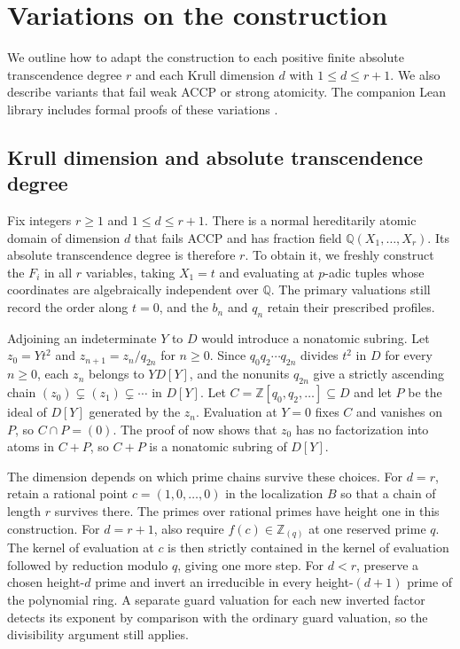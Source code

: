 \documentclass{article}
\theoremstyle{remark}
\begin{document}
\section{Variations on the construction}

We outline how to adapt the construction to each positive finite absolute transcendence degree $r$ and each Krull dimension $d$ with $1 \le d \le r + 1$.
We also describe variants that fail weak ACCP or strong atomicity.
The companion Lean library includes formal proofs of these variations \cite{LeanHA}.

\subsection{Krull dimension and absolute transcendence degree}
Fix integers $r \ge 1$ and $1 \le d \le r + 1$.
There is a normal hereditarily atomic domain of dimension $d$ that fails ACCP and has fraction field $\mathbb{Q}(X_1, \ldots, X_r)$.
Its absolute transcendence degree is therefore $r$.
To obtain it, we freshly construct the $F_i$ in all $r$ variables, taking $X_1 = t$ and evaluating at $p$-adic tuples whose coordinates are algebraically independent over $\mathbb{Q}$.
The primary valuations still record the order along $t = 0$, and the $b_n$ and $q_n$ retain their prescribed profiles.

Adjoining an indeterminate $Y$ to $D$ would introduce a nonatomic subring.
Let $z_0 = Yt^2$ and $z_{n + 1} = z_n/q_{2n}$ for $n \ge 0$.
Since $q_0 q_2 \cdots q_{2n}$ divides $t^2$ in $D$ for every $n \ge 0$, each $z_n$ belongs to $YD[Y]$, and the nonunits $q_{2n}$ give a strictly ascending chain $(z_0) \subsetneq (z_1) \subsetneq \cdots$ in $D[Y]$.
Let $C = \mathbb{Z}[q_0, q_2, \ldots] \subseteq D$ and let $P$ be the ideal of $D[Y]$ generated by the $z_n$.
Evaluation at $Y = 0$ fixes $C$ and vanishes on $P$, so $C \cap P = (0)$.
The proof of \cite[Theorem~6.4(6)]{CGH} now shows that $z_0$ has no factorization into atoms in $C + P$, so $C + P$ is a nonatomic subring of $D[Y]$.

The dimension depends on which prime chains survive these choices.
For $d = r$, retain a rational point $c = (1, 0, \ldots, 0)$ in the localization $B$ so that a chain of length $r$ survives there.
The primes over rational primes have height one in this construction.
For $d = r + 1$, also require $f(c) \in \mathbb{Z}_{(q)}$ at one reserved prime $q$.
The kernel of evaluation at $c$ is then strictly contained in the kernel of evaluation followed by reduction modulo $q$, giving one more step.
For $d < r$, preserve a chosen height-$d$ prime and invert an irreducible in every height-$(d + 1)$ prime of the polynomial ring.
A separate guard valuation for each new inverted factor detects its exponent by comparison with the ordinary guard valuation, so the divisibility argument still applies.
\end{document}
